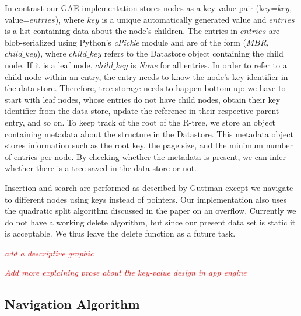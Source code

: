 \documentclass{scrartcl}
\newcommand{\TODO}[1]{\textcolor{red}{\boxed{\mathbf{TODO }} {\textit{#1}} }}
\begin{document}
In contrast our GAE implementation stores nodes as a key-value pair (key=$key$, value=$entries$), where $key$ is a unique automatically generated value and $entries$ is a list containing data about the node's children. The entries in $entries$ are blob-serialized using Python's \textit{cPickle} module and are of the form ($MBR$, $child\_key$), where $child\_key$ refers to the Datastore object containing the child node. If it is a leaf node, $child\_key$ is \textit{None} for all entries. In order to refer to a child node within an entry, the entry needs to know the node's key identifier in the data store. Therefore, tree storage needs to happen bottom up: we have to start with leaf nodes, whose entries do not have child nodes, obtain their key identifier from the data store, update the reference in their respective parent entry, and so on. To keep track of the root of the R-tree, we store an object containing metadata about the structure in the Datastore. This metadata object stores information such as the root key, the page size, and the minimum number of entries per node. By checking whether the metadata is present, we can infer whether there is a tree saved in the data store or not.

Insertion and search are performed as described by Guttman\cite{DBLP:conf/sigmod/Guttman84} except we navigate to different nodes using keys instead of pointers. Our implementation also uses the quadratic split algorithm discussed in the paper on an overflow. Currently we do not have a working delete algorithm, but since our present data set is static it is acceptable. We thus leave the delete function as a future task.

\TODO{add a descriptive graphic}

\TODO{Add more explaining prose about the key-value design in app engine}

\subsection{Navigation Algorithm}



\end{document}
